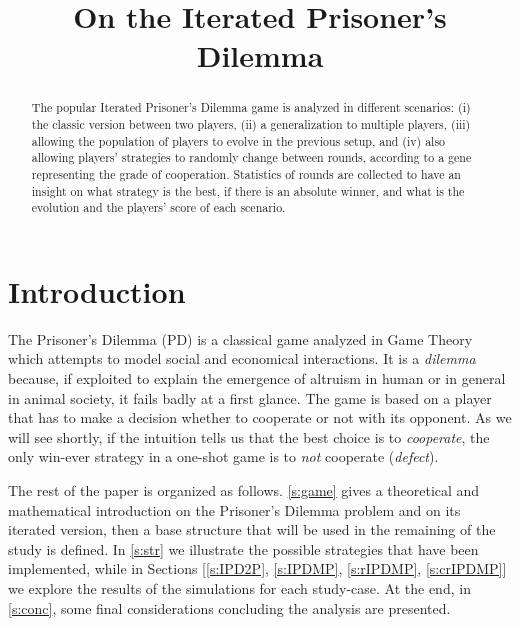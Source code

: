 \documentclass[journal,a4paper,10pt,twoside]{IEEEtran} %
\begin{document}
\title{On the Iterated Prisoner's Dilemma}

\author{%

}

\maketitle

\begin{abstract}
The popular Iterated Prisoner's Dilemma game is analyzed in different scenarios: (i) the classic version between two players, (ii) a generalization to multiple players, (iii) allowing the population of players to evolve in the previous setup, and (iv) also allowing players' strategies to randomly change between rounds, according to a gene representing the grade of cooperation. %
Statistics of rounds are collected to have an insight on what strategy is the best, if there is an absolute winner, and what is the evolution and the players' score of each scenario.
\end{abstract}

\section{Introduction} \label{s:intro}
The Prisoner's Dilemma (PD) is a classical game analyzed in Game Theory which attempts to model social and economical interactions. It is a \textit{dilemma} because, if exploited to explain the emergence of altruism in human or in general in animal society, it fails badly at a first glance. The game is based on a player that has to make a decision whether to cooperate or not with its opponent. As we will see shortly, if the intuition tells us that the best choice is to \textit{cooperate}, the only win-ever strategy in a one-shot game is to \textit{not} cooperate (\textit{defect}).

The rest of the paper is organized as follows.
\autoref{s:game} gives a theoretical and mathematical introduction on the Prisoner's Dilemma problem and on its iterated version, then a base structure that will be used in the remaining of the study is defined.
In \autoref{s:str} we illustrate the possible strategies that have been implemented, while in Sections [\ref{s:IPD2P}, \ref{s:IPDMP}, \ref{s:rIPDMP}, \ref{s:crIPDMP}] we explore the results of the simulations for each study-case.
At the end, in \autoref{s:conc}, some final considerations concluding the analysis are presented.
\end{document}
